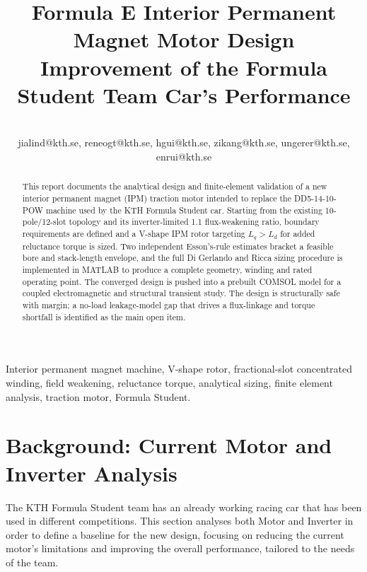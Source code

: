 \documentclass[10pt,final,journal,a4paper,oneside,twocolumn]{IEEEtran}
\title{Formula E Interior Permanent Magnet Motor Design\\
{\large Improvement of the Formula Student Team Car's Performance}}
\author{\IEEEauthorblockN{Jialin Dong, René García, Hadrien Guillaud, Zikang Liu, Lars Ungerer and Enrui Zhu}\\
jialind@kth.se, reneogt@kth.se, hgui@kth.se, zikang@kth.se, ungerer@kth.se, enrui@kth.se\\
\IEEEauthorblockA{Kungliga Tekniska H\"ogskolan (KTH), Stockholm, Sweden
}
}
\begin{document}
\renewcommand{\figurename}{Fig.}
\renewcommand{\tablename}{Tab.}
\newcommand{\sectionname}{Sect.}

\maketitle

\begin{IEEEkeywords}

Interior permanent magnet machine, V-shape rotor, fractional-slot concentrated winding, field weakening, reluctance torque, analytical sizing, finite element analysis, traction motor, Formula Student.

\end{IEEEkeywords}

\begin{abstract}
This report documents the analytical design and finite-element validation of a new interior permanent magnet (IPM) traction motor intended to replace the DD5-14-10-POW machine used by the KTH Formula Student car. Starting from the existing 10-pole/12-slot topology and its inverter-limited 1.1 flux-weakening ratio, boundary requirements are defined and a V-shape IPM rotor targeting $L_q>L_d$ for added reluctance torque is sized. Two independent Esson's-rule estimates bracket a feasible bore and stack-length envelope, and the full Di Gerlando and Ricca sizing procedure is implemented in MATLAB to produce a complete geometry, winding and rated operating point. The converged design is pushed into a prebuilt COMSOL model for a coupled electromagnetic and structural transient study. The design is structurally safe with margin; a no-load leakage-model gap that drives a flux-linkage and torque shortfall is identified as the main open item.
\end{abstract}

\section{Background: Current Motor and Inverter Analysis}
\label{SEC:Background}
The KTH Formula Student team has an already working racing car that has been used in different competitions. This section analyses both Motor and Inverter in order to define a baseline for the new design, focusing on reducing the current motor's limitations and improving the overall performance, tailored to the needs of the team.
\end{document}
